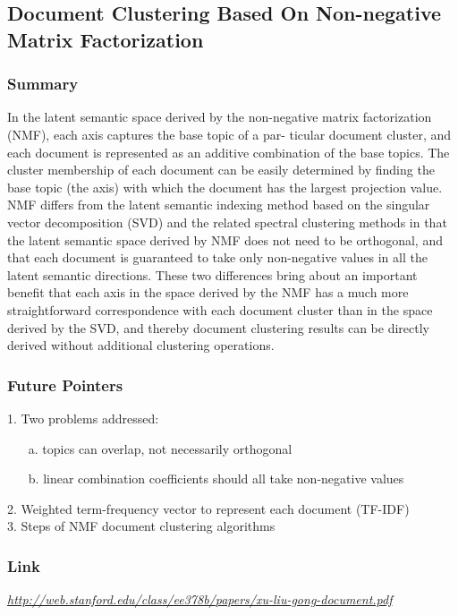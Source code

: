 \documentclass[10pt]{article}
\begin{document}
\subsection{Document Clustering Based On Non-negative Matrix Factorization \cite{label6}}
	\subsubsection{Summary}
	In the latent semantic space derived by the non-negative matrix factorization (NMF), each axis captures the base topic of a par- ticular document cluster, and each document is represented as an additive combination of the base topics. The cluster membership of each document can be easily determined by finding the base topic (the axis) with which the document has the largest projection value. NMF differs from the latent semantic indexing method based on the singular vector decomposition (SVD) and the related spectral clustering methods in that the latent semantic space derived by NMF does not need to be orthogonal, and that each document is guaranteed to take only non-negative values in all the latent semantic directions. These two differences bring about an important benefit that each axis in the space derived by the NMF has a much more straightforward correspondence with each document cluster than in the space derived by the SVD, and thereby document clustering results can be directly derived without additional clustering operations.
	\subsubsection{Future Pointers}
	1. Two problems addressed:
	\begin{enumerate}
	\item[a.] topics can overlap, not necessarily orthogonal
	\item[b.] linear combination coefficients should all take non-negative values
	\end{enumerate}
	2. Weighted term-frequency vector to represent each document (TF-IDF)\\
	3. Steps of NMF document clustering algorithms
	
	\subsubsection{Link}
	\href{http://web.stanford.edu/class/ee378b/papers/xu-liu-gong-document.pdf}{\textit{http://web.stanford.edu/class/ee378b/papers/xu-liu-gong-document.pdf}}
\end{document}
